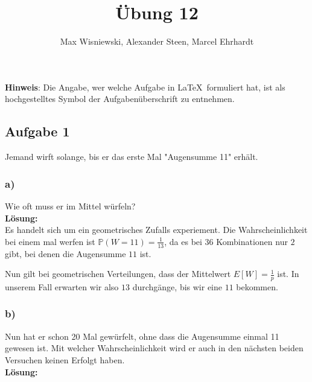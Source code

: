 \documentclass[11pt,a4paper,ngerman]{article}
\date{}
\title{Übung 12}
\author{Max Wisniewski\maxw, Alexander Steen\alex, Marcel Ehrhardt\marcel}
\newcommand{\Prob}{\mathbb{P}}
\begin{document}

\renewcommand{\figurename}{Figure}

\maketitle
\thispagestyle{fancy}

\begin{center}
\textbf{Hinweis}: Die Angabe, wer welche Aufgabe in \LaTeX\ formuliert hat, ist als hochgestelltes Symbol der Aufgabenüberschrift zu entnehmen.
\end{center}


\subsection*{Aufgabe 1}

Jemand wirft solange, bis er das erste Mal "Augensumme 11" erhält.

\subsubsection*{a)}
Wie oft muss er im Mittel würfeln?\\

\textbf{Lösung:}\\

Es handelt sich um ein geometrisches Zufalls experiement.
Die Wahrscheinlichkeit bei einem mal werfen ist
$\Prob(W = 11) = \frac{1}{13}$, da es bei $36$ Kombinationen nur $2$ gibt,
bei denen die Augensumme $11$ ist.

Nun gilt bei geometrischen Verteilungen, dass der Mittelwert
$E[W] = \frac{1}{p}$ ist. In unserem Fall erwarten wir also $13$
durchgänge, bis wir eine $11$ bekommen.

\subsubsection*{b)}

Nun hat er schon 20 Mal gewürfelt, ohne dass die Augensumme einmal 11 gewesen ist. Mit welcher Wahrscheinlichkeit wird er auch in den nächsten beiden Versuchen keinen Erfolgt haben.\\

\textbf{Lösung:}\\
\end{document}
